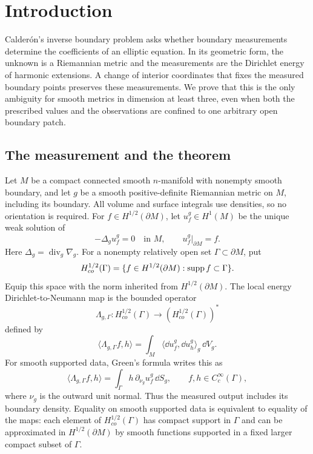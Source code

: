 \section{Introduction}
\label{intro:section}

Calder\'on's inverse boundary problem asks whether boundary measurements
determine the coefficients of an elliptic equation. In its geometric
form, the unknown is a Riemannian metric and the measurements are the
Dirichlet energy of harmonic extensions. A change of interior coordinates
that fixes the measured boundary points preserves these measurements.
We prove that this is the only ambiguity for smooth metrics in dimension
at least three, even when both the prescribed values and the observations
are confined to one arbitrary open boundary patch.

\subsection{The measurement and the theorem}

Let $M$ be a compact connected smooth $n$-manifold with nonempty smooth
boundary, and let $g$ be a smooth positive-definite Riemannian metric on
$M$, including its boundary. All volume and surface integrals use
densities, so no orientation is required. For $f\in H^{1/2}(\partial M)$,
let $u_f^g\in H^1(M)$ be the unique weak solution of
\[
 -\Delta_g u_f^g=0\quad\text{in }M,\qquad
 u_f^g|_{\partial M}=f.
\]
Here $\Delta_g=\operatorname{div}_g\nabla_g$. For a nonempty relatively
open set $\Gamma\subset\partial M$, put
\[
 H^{1/2}_{co}(\Gamma)
 =\{f\in H^{1/2}(\partial M):\operatorname{supp} f\subset\Gamma\}.
\]
Equip this space with the norm inherited from $H^{1/2}(\partial M)$.
The local energy Dirichlet-to-Neumann map is the bounded operator
\[
 \Lambda_{g,\Gamma}:H^{1/2}_{co}(\Gamma)
       \longrightarrow (H^{1/2}_{co}(\Gamma))^*
\]
defined by
\begin{equation}\label{intro:energy}
 \langle\Lambda_{g,\Gamma}f,h\rangle
 =\int_M\langle\dd u_f^g,\dd u_h^g\rangle_g\,\dd V_g.
\end{equation}
For smooth supported data, Green's formula writes this as
\begin{equation}\label{intro:density}
 \langle\Lambda_{g,\Gamma}f,h\rangle
 =\int_\Gamma h\,\partial_{\nu_g}u_f^g\,\dd S_g,
 \qquad f,h\in C_c^\infty(\Gamma),
\end{equation}
where $\nu_g$ is the outward unit normal. Thus the measured output
includes its boundary density. Equality on smooth supported data is
equivalent to equality of the maps: each element of
$H^{1/2}_{co}(\Gamma)$ has compact support in $\Gamma$ and can be
approximated in $H^{1/2}(\partial M)$ by smooth functions supported
in a fixed larger compact subset of $\Gamma$.

